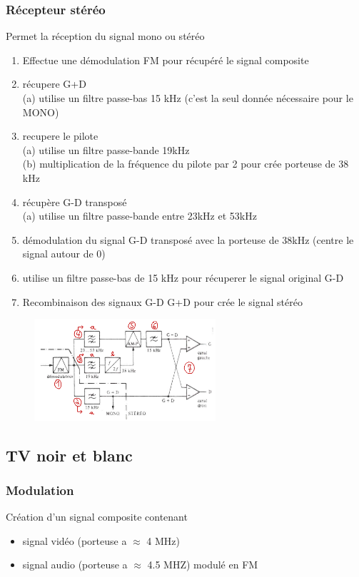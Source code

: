 			\subsubsection{Récepteur stéréo }
				
				Permet la réception du signal mono ou stéréo
				
				\begin{enumerate}
					\item Effectue une démodulation FM pour récupéré le signal composite
					\item récupere G+D\\
						(a) utilise un filtre passe-bas 15 kHz (c'est la seul donnée nécessaire pour le MONO)
						
					\item recupere le pilote\\
						(a) utilise un filtre passe-bande 19kHz\\
						(b) multiplication de la fréquence du pilote par 2  pour crée porteuse de 38 kHz
					\item récupère G-D transposé \\
						(a) utilise un filtre passe-bande entre 23kHz et 53kHz
					\item démodulation du signal G-D transposé avec la porteuse de 38kHz (centre le signal autour de 0)
					\item utilise un filtre passe-bas de 15 kHz pour récuperer le signal original G-D
					\item Recombinaison des signaux G-D G+D pour crée le signal stéréo
				\end{enumerate}
				
				\begin{figure}[htp]
				\centering
				\includegraphics[width=0.6\textwidth]{img/recepteurStereo.png}
				\end{figure}
		\subsection{TV noir et blanc}
			\subsubsection{Modulation}
				 Création d'un signal composite contenant
				 \begin{itemize}
				 	\item signal vidéo (porteuse a $\approx$ 4 MHz)
				 	\item signal audio (porteuse a $\approx$ 4.5 MHZ) modulé en FM
				 	
				 \end{itemize}
				 
